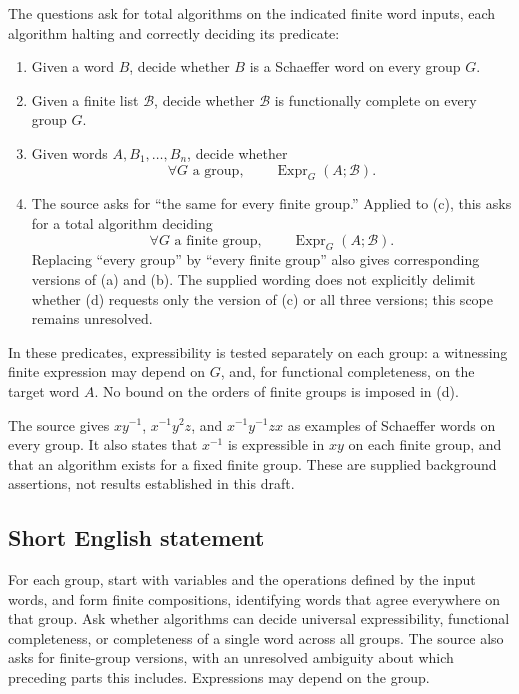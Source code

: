 \documentclass[11pt]{article}
\begin{document}
The questions ask for total algorithms on the indicated finite word inputs, each algorithm halting and correctly deciding its predicate:
\begin{enumerate}
\item[(a)] Given a word \(B\), decide whether \(B\) is a Schaeffer word on every group \(G\).
\item[(b)] Given a finite list \(\mathcal B\), decide whether \(\mathcal B\) is functionally complete on every group \(G\).
\item[(c)] Given words \(A,B_1,\ldots,B_n\), decide whether
\[
\forall G\text{ a group},\qquad
\operatorname{Expr}_G(A;\mathcal B).
\]
\item[(d)] The source asks for ``the same for every finite group.'' Applied to (c), this asks for a total algorithm deciding
\[
\forall G\text{ a finite group},\qquad
\operatorname{Expr}_G(A;\mathcal B).
\]
Replacing ``every group'' by ``every finite group'' also gives corresponding versions of (a) and (b). The supplied wording does not explicitly delimit whether (d) requests only the version of (c) or all three versions; this scope remains unresolved.
\end{enumerate}
In these predicates, expressibility is tested separately on each group: a witnessing finite expression may depend on \(G\), and, for functional completeness, on the target word \(A\). No bound on the orders of finite groups is imposed in (d).

The source gives \(xy^{-1}\), \(x^{-1}y^2z\), and \(x^{-1}y^{-1}zx\) as examples of Schaeffer words on every group. It also states that \(x^{-1}\) is expressible in \(xy\) on each finite group, and that an algorithm exists for a fixed finite group. These are supplied background assertions, not results established in this draft.
\subsection{Short English statement}
For each group, start with variables and the operations defined by the input words, and form finite compositions, identifying words that agree everywhere on that group. Ask whether algorithms can decide universal expressibility, functional completeness, or completeness of a single word across all groups. The source also asks for finite-group versions, with an unresolved ambiguity about which preceding parts this includes. Expressions may depend on the group.
\end{document}
